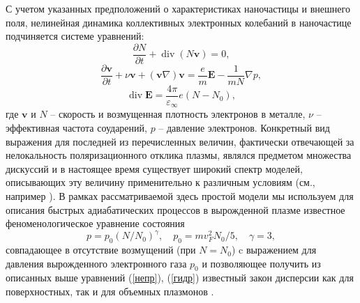 \documentclass[12pt, a4paper]{article}
\renewcommand{\vec}{\mathbf}
\def \eps {\varepsilon}
\newcommand{\dt}[1]{\frac{\partial {#1}}{\partial t}}
\begin{document}
С учетом указанных предположений о характеристиках наночастицы и внешнего поля, нелинейная динамика коллективных электронных колебаний в наночастице подчиняется системе уравнений:
\begin{equation} 
	\label{непр}
	\dt{N} + \operatorname{div}(N \vec{v}) = 0,
\end{equation}
\begin{equation} 
	\label{гидр}
	\dt{\vec{v}} + \nu \vec{v} +(\vec{v} \nabla)\vec{v} = \frac{e}{m}\vec{E} - \frac{1}{mN} \nabla p, 
\end{equation}
\begin{equation} 
	\label{максв}
	\operatorname{div}\vec{E} = \frac{4\pi}{\eps_\infty}e(N-N_0),
\end{equation}
где $\vec{v}$ и $N$ – скорость и возмущенная плотность электронов в металле, $\nu$ – эффективная частота соударений, 
$p$ – давление электронов. Конкретный вид выражения для последней из перечисленных величин, фактически отвечающей за нелокальность поляризационного отклика плазмы, являлся предметом множества дискуссий \cite{Boardman1982} и в настоящее время существует широкий спектр моделей, описывающих эту величину применительно к различным условиям (см., например \cite{Vladimirov2011,Haas2015,Moldabekov2018}). В рамках рассматриваемой здесь простой модели мы используем для описания быстрых адиабатических процессов в вырожденной плазме известное феноменологическое уравнение состояния
\begin{equation}
	\label{p}
	p = p_0 (N/N_0)^\gamma, \quad p_0 = m v_F^2 N_0/5, \quad \gamma = 3,
\end{equation}
совпадающее в отсутствие возмущений (при $N = N_0$) c выражением для давления вырожденного электронного газа $p_0$ и позволяющее получить из описанных выше уравнений (\ref{непр}), (\ref{гидр}) известный закон дисперсии как для поверхностных, так и для объемных плазмонов \cite{Haas2011, Boardman1982, Manfredi2021}.
\end{document}
